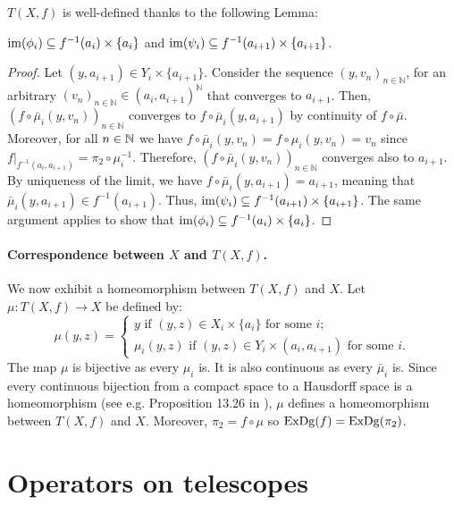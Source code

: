 $T(X,f)$ is well-defined thanks to the following Lemma:

\begin{lem}
\label{lem:restrictions}
$\mathrm{im}(\phi_i)\subseteq f^{-1}(a_i)\times\{a_i\}$ and 
$\mathrm{im}(\psi_i)\subseteq f^{-1}(a_{i+1})\times\{a_{i+1}\}$.
\end{lem}

\begin{proof}
Let $(y,a_{i+1})\in Y_i\times\{a_{i+1}\}$.  Consider the sequence
$(y,v_n)_{n\in\mathbb{N}}$, for an arbitrary
$(v_n)_{n\in\mathbb{N}}\in(a_i,a_{i+1})^{\mathbb{N}}$ that converges
to $a_{i+1}$.  Then, $(f\circ\bar{\mu}_i(y,v_n))_{n\in\mathbb{N}}$
converges to $f\circ\bar{\mu}_i(y,a_{i+1})$ by continuity of
$f\circ\bar{\mu}$.  Moreover, for all $n\in\mathbb{N}$ we have
$f\circ\bar{\mu}_i(y,v_n)=f\circ\mu_i(y,v_n)=v_n$ since
$f|_{f^{-1}(a_i,a_{i+1})}=\pi_2\circ\mu_i^{-1}$.  Therefore,
$(f\circ\bar{\mu}_i(y,v_n))_{n\in\mathbb{N}}$ converges also to
$a_{i+1}$. By uniqueness of the limit, we have
$f\circ\bar{\mu}_i(y,a_{i+1})=a_{i+1}$, meaning that
$\bar{\mu}_i(y,a_{i+1})\in f^{-1}(a_{i+1})$. Thus,
${\rm im}(\psi_i)\subseteq f^{-1}(a_{i+1})\times\{a_{i+1}\}$.  
The same argument applies to show that 
${\rm im}(\phi_i)\subseteq f^{-1}(a_i)\times\{a_i\}$.
\end{proof}

\paragraph*{Correspondence between $X$ and $T(X,f)$.} We now exhibit a homeomorphism between $T(X,f)$ and $X$. 
Let $\mu:T(X,f)\rightarrow X$ be defined by:
%
\[
 \mu(y,z)= \left \{ \begin{array}{l} 
y\text{ if } (y,z)\in X_i\times\{a_i\} \mbox{ for some $i$};\\
\mu_i(y,z) \text{ if } (y,z)\in Y_i\times (a_i,a_{i+1}) \mbox{ for some $i$}.
\end{array} \right.
\]
%
The map $\mu$ is bijective as every $\mu_i$ is. It is also continuous as every $\bar{\mu}_i$ is.
Since every continuous bijection from a compact space to a Hausdorff space is a homeomorphism 
(see e.g. Proposition 13.26 in \cite{Sutherland09}),
$\mu$ defines a homeomorphism between $T(X,f)$ and $X$. Moreover, $\pi_2=f\circ\mu$ so $\mathrm{ExDg}(f)=\mathrm{ExDg}(\pi_2)$. %

\section*{Operators on telescopes}
\label{sec:operator}

